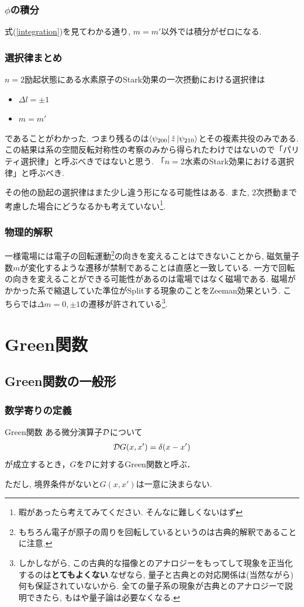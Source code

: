 \documentclass[10.5pt,a4paper]{jreport}
\begin{document}
\subsection{$\phi$の積分}
式(\ref{integration})を見てわかる通り, $m = m'$以外では積分がゼロになる.
\subsection{選択律まとめ}
$n = 2$励起状態にある水素原子のStark効果の一次摂動における選択律は
\begin{itemize}
\item $\Delta l = \pm 1$
\item $m = m'$
\end{itemize}
であることがわかった. つまり残るのは$\bra{\psi_{200}}\hat{z}\ket{\psi_{210}}$とその複素共役のみである. この結果は系の空間反転対称性の考察のみから得られたわけではないので「パリティ選択律」と呼ぶべきではないと思う. 「$n=2$水素のStark効果における選択律」と呼ぶべき.

その他の励起の選択律はまた少し違う形になる可能性はある. また, 2次摂動まで考慮した場合にどうなるかも考えていない\footnote{暇があったら考えてみてください. そんなに難しくないはず}.
\subsection{物理的解釈}
一様電場には電子の回転運動\footnote{もちろん電子が原子の周りを回転しているというのは古典的解釈であることに注意.}の向きを変えることはできないことから, 磁気量子数$m$が変化するような遷移が禁制であることは直感と一致している. 一方で回転の向きを変えることができる可能性があるのは電場ではなく磁場である. 磁場がかかった系で縮退していた準位がSplitする現象のことをZeeman効果という. こちらでは$\Delta m = 0, \pm 1$の遷移が許されている\footnote{しかしながら, この古典的な描像とのアナロジーをもってして現象を正当化するのは\textbf{とてもよくない}.なぜなら, 量子と古典との対応関係は(当然ながら)何も保証されていないから. 全ての量子系の現象が古典とのアナロジーで説明できたら, もはや量子論は必要なくなる.}.
\newpage
\chapter{Green関数}
\section{Green関数の一般形}
\subsection{数学寄りの定義}
\begin{itembox}[c]{Green関数}
  ある微分演算子${\cal D}$について
  \begin{eqnarray}
    {\cal D}G(x, x') = \delta(x-x')
  \end{eqnarray}
  が成立するとき，$G$を${\cal D}$に対するGreen関数と呼ぶ．
\end{itembox}
ただし, 境界条件がないと$G(x, x')$は一意に決まらない.
\end{document}
